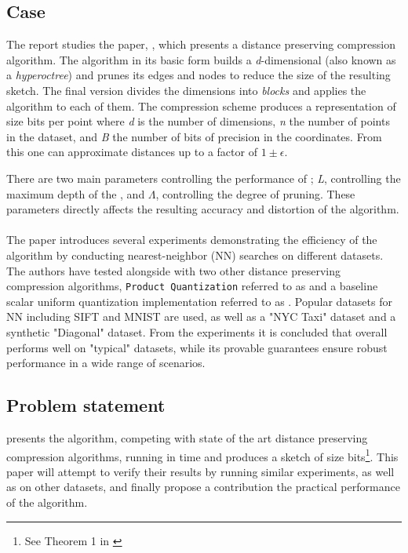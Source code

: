 \subsection{Case} %
The report studies the paper, \cite{wagner17}, which presents a distance preserving compression algorithm. The algorithm in its basic form builds a \textit{d}-dimensional \qt{}(also known as a \textit{hyperoctree}) and prunes its edges and nodes to reduce the size of the resulting sketch. The final version divides the dimensions into \textit{blocks} and applies the algorithm to each of them. The compression scheme produces a representation of size  bits per point where \textit{d} is the number of dimensions, \textit{n} the number of points in the dataset, and \textit{B} the number of bits of precision in the coordinates. From this one can approximate distances up to a factor of $1\pm\epsilon$. 

There are two main parameters controlling the performance of \qs{}; \textit{L}, controlling the maximum depth of the \qt{}, and $\Lambda$, controlling the degree of pruning. These parameters directly affects the resulting accuracy and distortion of the algorithm.
\\
\\
The paper introduces several experiments demonstrating the efficiency of the algorithm by conducting nearest-neighbor (NN) searches on different datasets. The authors have tested \qs{} alongside with two other distance preserving compression algorithms, \texttt{Product Quantization} referred to as \pq{} and a baseline scalar uniform quantization implementation referred to as \gr{}. Popular datasets for NN including SIFT and MNIST are used, as well as a "NYC Taxi" dataset and a synthetic "Diagonal" dataset. From the experiments it is concluded that \qs{} overall performs well on "typical" datasets, while its provable guarantees ensure robust performance in a wide range of scenarios\cite[p. 2, l. 38-40]{wagner17}. 

\subsection{Problem statement} %
\cite{wagner17} presents the \qs{} algorithm, competing with state of the art distance preserving compression algorithms, running in  time and produces a sketch of size  bits\footnote{See Theorem 1 in \cite[p. 3]{wagner17}}. This paper will attempt to verify their results by running similar experiments, as well as on other datasets, and finally propose a contribution the practical performance of the \qs{} algorithm.



